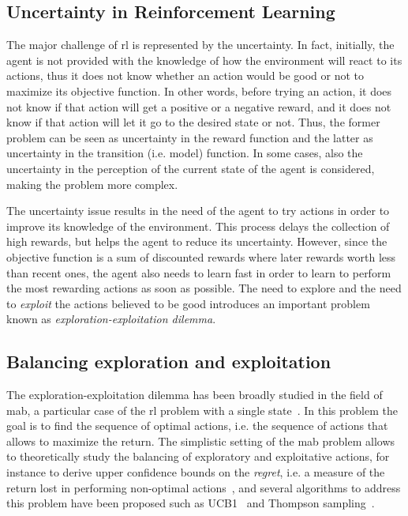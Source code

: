 \subsection{Uncertainty in Reinforcement Learning}
The major challenge of \gls{rl} is represented by the uncertainty. In fact, initially, the agent is not provided with the knowledge of how the environment will react to its actions, thus it does not know whether an action would be good or not to maximize its objective function. In other words, before trying an action, it does not know if that action will get a positive or a negative reward, and it does not know if that action will let it go to the desired state or not. Thus, the former problem can be seen as uncertainty in the reward function and the latter as uncertainty in the transition (i.e. model) function. In some cases, also the uncertainty in the perception of the current state of the agent is considered, making the problem more complex.

The uncertainty issue results in the need of the agent to try actions in order to improve its knowledge of the environment. This process delays the collection of high rewards, but helps the agent to reduce its uncertainty. However, since the objective function is a sum of discounted rewards where later rewards worth less than recent ones, the agent also needs to learn fast in order to learn to perform the most rewarding actions as soon as possible. The need to explore and the need to \textit{exploit} the actions believed to be good introduces an important problem known as \textit{exploration-exploitation dilemma}.

\subsection{Balancing exploration and exploitation}
The exploration-exploitation dilemma has been broadly studied in the field of \gls{mab}, a particular case of the \gls{rl} problem with a single state~\cite{lai1985asymptotically}. In this problem the goal is to find the sequence of optimal actions, i.e. the sequence of actions that allows to maximize the return. The simplistic setting of the \gls{mab} problem allows to theoretically study the balancing of exploratory and exploitative actions, for instance to derive upper confidence bounds on the \textit{regret}, i.e. a measure of the return lost in performing non-optimal actions~\cite{bubeck2012regret, agrawal2012analysis, vermorel2005multi}, and several algorithms to address this problem have been proposed such as UCB1~\cite{auer2002finite} and Thompson sampling~\cite{thompson1933likelihood}.

